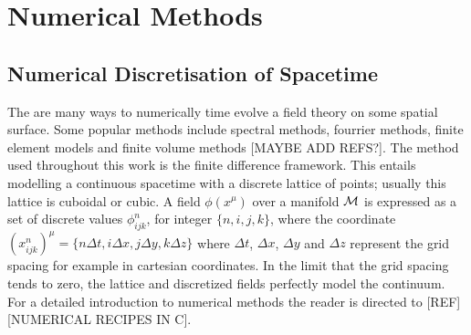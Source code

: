 







\section{Numerical Methods}
\subsection{Numerical Discretisation of Spacetime} \label{grchombo:sec:numericaldisc}

The are many ways to numerically time evolve a field theory on some spatial surface. Some popular methods include spectral methods, fourrier methods, finite element models and finite volume methods [MAYBE ADD REFS?]. The method used throughout this work is the finite difference framework. This entails modelling a continuous spacetime with a discrete lattice of points; usually this lattice is cuboidal or cubic. A field $\phi(x^\mu)$ over a manifold $\mathcal{M}$ is expressed as a set of discrete values $\phi^n_{ijk}$, for integer $\{n,i,j,k\}$, where the coordinate $(x^n_{ijk})^\mu = \{n \Delta t, i \Delta x, j \Delta y, k \Delta z \}$ where $\Delta t$, $\Delta x$, $\Delta y$ and $\Delta z$ represent the grid spacing for example in cartesian coordinates. In the limit that the grid spacing tends to zero, the lattice and discretized fields perfectly model the continuum. For a detailed introduction to numerical methods the reader is directed to [REF] [NUMERICAL RECIPES IN C].

